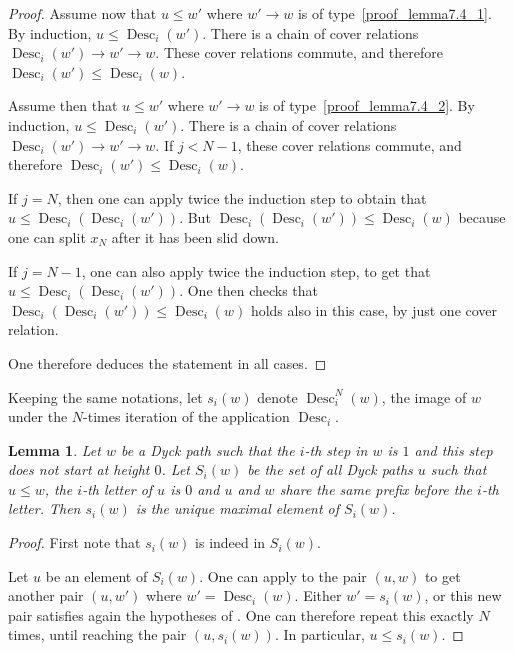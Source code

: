 \documentclass[10pt]{article}
\newtheorem{lemma}[lemma]{Lemma}
\theoremstyle{definition}
\DeclareMathOperator{\des}{Desc}
\begin{document}
\begin{proof}
  Assume now that $u \leq w'$ where $w' \to w$ is of type~\eqref{proof_lemma7.4_1}. By
  induction, $u \leq \des_i(w')$. There is a chain of cover relations
  $\des_i(w') \to w' \to w$. These cover relations commute, and therefore
  $\des_i(w') \leq \des_i(w)$.

  Assume then that $u \leq w'$ where $w' \to w$ is of type~\eqref{proof_lemma7.4_2}. By
  induction, $u \leq \des_i(w')$. There is a chain of cover relations
  $\des_i(w') \to w' \to w$. If $j < N - 1$, these cover relations
  commute, and therefore $\des_i(w') \leq \des_i(w)$.

  If $j = N$, then one can apply twice the induction step to obtain that
  $u \leq \des_i(\des_i(w'))$. But $\des_i(\des_i(w')) \leq \des_i(w)$
  because one can split $x_N$ after it has been slid down.

  If $j = N-1$, one can also apply twice the induction step, to get
  that $u \leq \des_i(\des_i(w'))$. One then checks that
  $\des_i(\des_i(w')) \leq \des_i(w)$ holds also in this case, by just
  one cover relation.

  One therefore deduces the statement in all cases.
\end{proof}

Keeping the same notations, let $s_i(w)$ denote $\des_i^N(w)$, the
image of $w$ under the $N$-times iteration of the application
$\des_i$.

\begin{lemma}
  \label{force_0}
  Let $w$ be a Dyck path such that the $i$-th step in $w$ is $1$ and
  this step does not start at height $0$. Let $S_i(w)$ be the set
  of all Dyck paths $u$ such that $u \leq w$, the $i$-th letter of $u$
  is $0$ and $u$ and $w$ share the same prefix before the $i$-th letter.
  Then $s_i(w)$ is the unique maximal element of $S_i(w)$.
\end{lemma}
\begin{proof}
  First note that $s_i(w)$ is indeed in $S_i(w)$.

  Let $u$ be an element of $S_i(w)$. One can apply 
  to the pair $(u,w)$ to get another pair $(u, w')$ where
  $w'=\des_i(w)$. Either $w' = s_i(w)$, or this new pair satisfies
  again the hypotheses of . One can therefore repeat
  this exactly $N$ times, until reaching the pair $(u,s_i(w))$. In
  particular, $u \leq s_i(w)$.
\end{proof}
\end{document}
